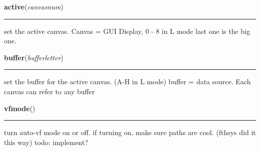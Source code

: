     \label{dv:active}

    \vspace{0.5ex}

    \begin{boxedminipage}{\textwidth}

    \raggedright \textbf{active}(\textit{canvasnum})

    \vspace{-1.5ex}

    \rule{\textwidth}{0.5\fboxrule}
    set the active canvas. Canvas = GUI Display, 0 - 8 in L mode last one 
    is the big one.

    \vspace{1ex}

    \end{boxedminipage}

    \label{dv:buffer}

    \vspace{0.5ex}

    \begin{boxedminipage}{\textwidth}

    \raggedright \textbf{buffer}(\textit{bufferletter})

    \vspace{-1.5ex}

    \rule{\textwidth}{0.5\fboxrule}
    set the buffer for the active canvas.     (A-H in L mode) buffer = data
    source. Each canvas can refer to any buffer

    \vspace{1ex}

    \end{boxedminipage}

    \label{dv:vfmode}

    \vspace{0.5ex}

    \begin{boxedminipage}{\textwidth}

    \raggedright \textbf{vfmode}()

    \vspace{-1.5ex}

    \rule{\textwidth}{0.5\fboxrule}
    turn auto-vf mode on or off. if turning on, make sure paths are cool. 
    (fthsys did it this way) todo: implement?

    \vspace{1ex}

    \end{boxedminipage}


